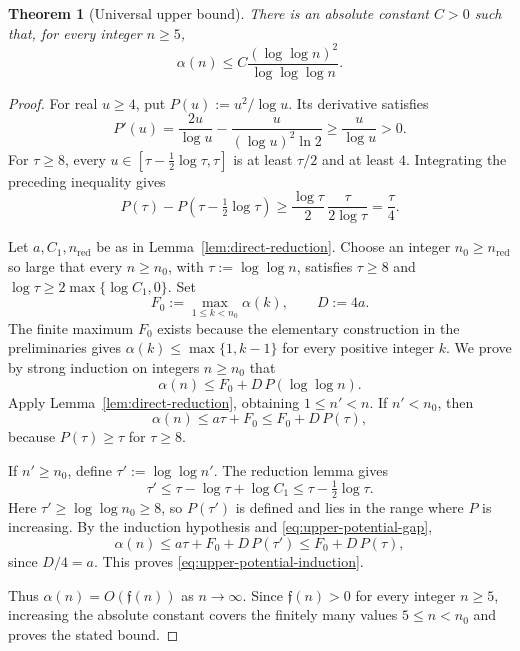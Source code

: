 \documentclass[11pt]{article}
\newtheorem{theorem}{Theorem}[section]
\theoremstyle{definition}
\theoremstyle{remark}
\newcommand{\growth}[1]{\mathfrak f(#1)}
\begin{document}
\begin{theorem}[Universal upper bound]\label{thm:universal-upper}
There is an absolute constant $C>0$ such that, for every integer $n\ge5$,
\[
  \alpha(n)\le
  C\frac{(\log\log n)^2}{\log\log\log n}.
\]
\end{theorem}

\begin{proof}
For real $u\ge4$, put $P(u):=u^2/\log u$.  Its derivative satisfies
\[
  P'(u)=\frac{2u}{\log u}
         -\frac{u}{(\log u)^2\ln2}
       \ge\frac{u}{\log u}>0.
\]
For $\tau\ge8$, every $u\in[\tau-\tfrac12\log \tau,\tau]$ is at least $\tau/2$ and
at least $4$.  Integrating the preceding inequality gives
\begin{equation}
  P(\tau)-P\!\left(\tau-\tfrac12\log \tau\right)
  \ge\frac{\log \tau}{2}\,\frac{\tau}{2\log \tau}
  =\frac \tau4.
  \label{eq:upper-potential-gap}
\end{equation}

Let $a,C_1,n_{\mathrm{red}}$ be as in Lemma~\ref{lem:direct-reduction}.
Choose an integer $n_0\ge n_{\mathrm{red}}$ so large that every $n\ge n_0$, with
$\tau:=\log\log n$, satisfies $\tau\ge8$ and
$\log \tau\ge2\max\{\log C_1,0\}$.  Set
\[
  F_0:=\max_{1\le k<n_0}\alpha(k),
  \qquad D:=4a.
\]
The finite maximum $F_0$ exists because the elementary construction in
the preliminaries gives $\alpha(k)\le\max\{1,k-1\}$ for every positive
integer $k$.  We prove by strong induction on integers $n\ge n_0$ that
\begin{equation}
  \alpha(n)\le F_0+D\,P(\log\log n).
  \label{eq:upper-potential-induction}
\end{equation}
Apply Lemma~\ref{lem:direct-reduction}, obtaining $1\le n'<n$.
If $n'<n_0$, then
\[
  \alpha(n)\le a\tau+F_0\le F_0+D\,P(\tau),
\]
because $P(\tau)\ge \tau$ for $\tau\ge8$.

If $n'\ge n_0$, define $\tau':=\log\log n'$.  The reduction lemma gives
\[
  \tau'\le \tau-\log \tau+\log C_1
      \le \tau-\tfrac12\log \tau.
\]
Here $\tau'\ge\log\log n_0\ge8$, so $P(\tau')$ is defined and lies in the
range where $P$ is increasing.  By the induction hypothesis and
\eqref{eq:upper-potential-gap},
\[
  \alpha(n)
  \le a\tau+F_0+D\,P(\tau')
  \le F_0+D\,P(\tau),
\]
since $D/4=a$.  This proves \eqref{eq:upper-potential-induction}.

Thus $\alpha(n)=O(\growth{n})$ as $n\to\infty$.
Since $\growth{n}>0$ for every integer $n\ge5$, increasing the absolute
constant covers the finitely many values $5\le n<n_0$ and proves the
stated bound.
\end{proof}
\end{document}
